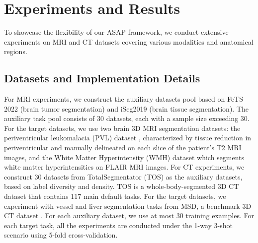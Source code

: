 \vspace{-0.5cm}
\section{Experiments and Results}
\vspace{-0.2cm}
To showcase the flexibility of our ASAP framework, we conduct extensive experiments on MRI and CT datasets covering various modalities and anatomical regions.
\vspace{-0.2cm}
\subsection{Datasets and Implementation Details}
\vspace{-0.1cm}
For MRI experiments, 
we construct the auxiliary datasets pool based on FeTS 2022 \cite{pati2021federated} 
(brain tumor segmentation) and iSeg2019 \cite{sun2021multi} (brain tissue segmentation). The auxiliary task pool consists of 30 datasets, each with a sample size exceeding 30.
For the target datasets, we use two brain 3D MRI segmentation datasets:
the periventricular leukomalacia (PVL) dataset \cite{yang2021joint}, characterized by tissue reduction in periventricular and manually delineated on each slice of the patient’s T2 MRI images, and the White Matter Hyperintensity (WMH) dataset \cite{kuijf2019standardized}
which segments white matter hyperintensities on FLAIR MRI images.
For CT experiments, we construct 30 datasets from TotalSegmentator (TOS) \cite{wasserthal2023totalsegmentator} as the auxiliary datasets, based on label diversity and density.
TOS is a whole-body-segmented 3D CT dataset that contains 117 main default tasks.
For the target datasets, we experiment with vessel and liver segmentation tasks from MSD, a benchmark 3D CT dataset \cite{antonelli2022medical}.
For each auxiliary dataset, we use at most 30 training examples.
For each target task, all the experiments are conducted under the 1-way 3-shot scenario using 5-fold cross-validation.
